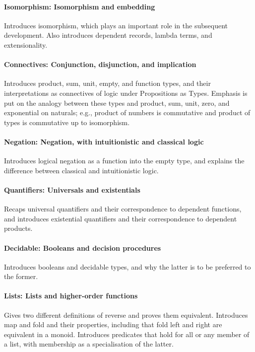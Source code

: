 \documentclass[preprint,authoryear]{elsarticle}
\begin{document}
\paragraph{Isomorphism: Isomorphism and embedding}
Introduces isomorphism, which plays an important role in the
subsequent development.  Also introduces dependent records, lambda
terms, and extensionality.

\paragraph{Connectives: Conjunction, disjunction, and implication}
Introduces product, sum, unit, empty, and function types, and their
interpretations as connectives of logic under Propositions as Types.
Emphasis is put on the analogy between these types and product, sum,
unit, zero, and exponential on naturals; e.g., product of numbers is
commutative and product of types is commutative up to isomorphism.

\paragraph{Negation: Negation, with intuitionistic and classical logic}
Introduces logical negation as a function into the empty
type, and explains the difference between classical and intuitionistic
logic.

\paragraph{Quantifiers: Universals and existentials}
Recaps universal quantifiers and their correspondence to dependent
functions, and introduces existential quantifiers and their
correspondence to dependent products.

\paragraph{Decidable: Booleans and decision procedures}
Introduces booleans and decidable types, and why the latter is to be
preferred to the former.

\paragraph{Lists: Lists and higher-order functions}
Gives two different definitions of reverse and proves them equivalent.
Introduces map and fold and their properties, including that fold left
and right are equivalent in a monoid.  Introduces predicates that hold
for all or any member of a list, with membership as a specialisation
of the latter.
\end{document}
